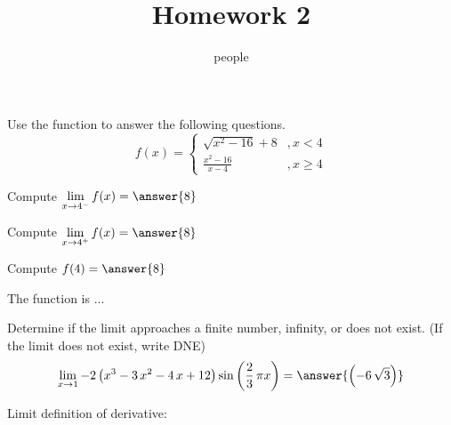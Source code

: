 \documentclass[•]{ximera}
\title{Homework 2}
\author{people}
\begin{document}
\maketitle


\begin{shuffle}
\begin{problem}

Use the function to answer the following questions.
\[f(x)=\left\{\begin{array}{ll}{{\sqrt{x^{2} - 16} + 8}}&,x<{{4}}\\[5pt]
{{\frac{x^{2} - 16}{x - 4}}}&,x\geq{{4}}
\end{array}\right.\]
\begin{shuffle}
\begin{problem}
Compute $\lim\limits_{x\to{{4}}^-}f(x)=\answer{{{8}}}$\\[1in]
\end{problem}
\begin{problem}
Compute $\lim\limits_{x\to{{4}}^+}f(x)=\answer{{{8}}}$\\[1in]
\end{problem}
\begin{problem}
Compute $f({{4}})=\answer{{{8}}}$\\[1in]
\end{problem}
\begin{problem}
The function is ...
\begin{multipleChoice}
\end{multipleChoice}
\end{problem}
\end{shuffle}
\end{problem}%





\begin{problem}
Determine if the limit approaches a finite number, infinity, or does not exist. (If the limit does not exist, write DNE)
\[\lim_{x\to{{1}}}{{-2 \, {\left(x^{3} - 3 \, x^{2} - 4 \, x + 12\right)} \sin\left(\frac{2}{3} \, \pi x\right)}}=\answer{{{\left(-6 \, \sqrt{3}\right)}}}\]

\end{problem}%
\end{shuffle}


Limit definition of derivative:
\end{document}
